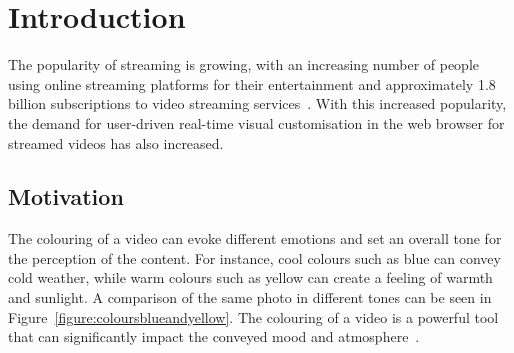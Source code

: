 \documentclass[../MasterThesis.tex]{subfiles}
\begin{document}
	\newpage
	\section{Introduction} \label{section:introduction}
	
	
	The popularity of streaming is growing, with an increasing number of people using online streaming platforms for their entertainment and approximately 1.8 billion subscriptions to video streaming services~\cite{nielsen, stats}.
	With this increased popularity, the demand for user-driven real-time visual customisation in the web browser for streamed videos has also increased.
	
	
	
	
	
	
	
	
	
	
	
	
	
	
	
	
	
	
	\subsection{Motivation} \label{subsection:motivation}
	
	
	The colouring of a video can evoke different emotions and set an overall tone for the perception of the content. For instance, cool colours such as blue can convey cold weather, while warm colours such as yellow can create a feeling of warmth and sunlight. A comparison of the same photo in different tones can be seen in Figure~\ref{figure:coloursblueandyellow}.
	The colouring of a video is a powerful tool that can significantly impact the conveyed mood and atmosphere~\cite{colorgrading1, colorgrading2}.
	
	
\end{document}
